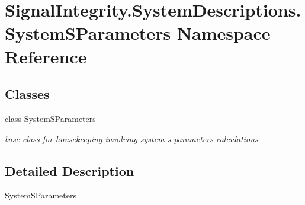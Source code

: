 \hypertarget{namespaceSignalIntegrity_1_1SystemDescriptions_1_1SystemSParameters}{}\section{Signal\+Integrity.\+System\+Descriptions.\+System\+S\+Parameters Namespace Reference}
\label{namespaceSignalIntegrity_1_1SystemDescriptions_1_1SystemSParameters}
\subsection*{Classes}
\begin{DoxyCompactItemize}
\item 
class \hyperlink{classSignalIntegrity_1_1SystemDescriptions_1_1SystemSParameters_1_1SystemSParameters}{System\+S\+Parameters}
\begin{DoxyCompactList}\small\item\em base class for housekeeping involving system s-\/parameters calculations \end{DoxyCompactList}\end{DoxyCompactItemize}


\subsection{Detailed Description}
\begin{DoxyVerb}SystemSParameters\end{DoxyVerb}
 